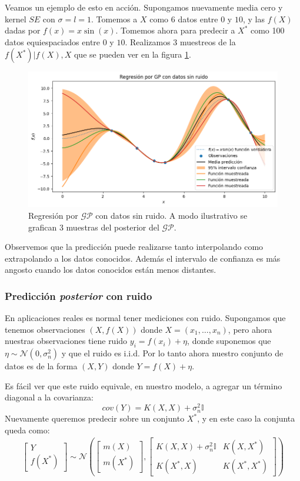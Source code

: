 \documentclass[a4paper]{article}
\newcommand{\gp}{\ensuremath{\mathcal{GP}}}
\begin{document}
Veamos un ejemplo de esto en acción. Supongamos nuevamente media cero y kernel $SE$ con $\sigma=l=1$. Tomemos a $X$ como 6 datos entre 0 y $10$, y las $f(X)$ dadas por $f(x)=x\sin(x)$. Tomemos ahora para predecir a $X^*$ como 100 datos equiespaciados entre $0$ y $10$. Realizamos 3 muestreos de la $f(X^*) | f(X), X$ que se pueden ver en la figura \ref{fig:gpostsinruido}.
\begin{figure}[h]
	\centering
	\includegraphics[trim={0cm 0cm 0cm 0cm},clip,width=\textwidth]{gppostsinruido.png}
	\caption{Regresión por $\gp$ con datos sin ruido. A modo ilustrativo se grafican 3 muestras del posterior del $\gp$.}
	\label{fig:gpostsinruido}
\end{figure}

Observemos que la predicción puede realizarse tanto interpolando como extrapolando a los datos conocidos. Además el intervalo de confianza es más angosto cuando los datos conocidos están menos distantes.



\subsubsection{Predicción \emph{posterior} con ruido}
En aplicaciones reales es normal tener mediciones con ruido. Supongamos que tenemos observaciones $(X,f(X))$ donde $X=\left(x_1,\dots,x_n\right)$, pero ahora nuestras observaciones tiene ruido $y_i = f(x_i) + \eta$, donde suponemos que $\eta \sim \mathcal{N}(0, \sigma^2_n)$ y que el ruido es i.i.d. Por lo tanto ahora nuestro conjunto de datos es de la forma $(X,Y)$ donde $Y=f(X) + \eta$. 

Es fácil ver que este ruido equivale, en nuestro modelo, a agregar un término diagonal a la covarianza:
$$ cov(Y) = K(X,X) + \sigma^2_n\mathbb{I} $$
Nuevamente queremos predecir sobre un conjunto $X^*$, y en este caso la conjunta queda como:
\begin{align}
	\begin{bmatrix} Y \\ f(X^*)  \end{bmatrix}
	\sim \mathcal{N} \left(
	\begin{bmatrix} m(X) \\ m(X^*)  \end{bmatrix}, 
	\begin{bmatrix}
		K(X,X) + \sigma_n^2\mathbb{I} & K(X, X^*) \\ K(X^*,X) & K(X^*,X^*)
	\end{bmatrix}
	\right)
\end{align}
\end{document}
